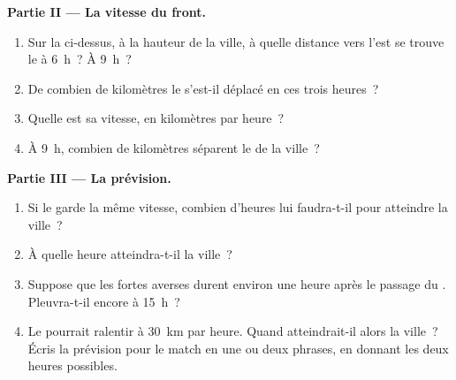 \begin{problem}
\noindent\textbf{Partie II --- La vitesse du front.}\par\nopagebreak
\begin{enumerate}[resume, beginpenalty=10000]
  \item Sur la  ci-dessus, à la hauteur de la ville, à quelle
        distance vers l'est se trouve le  à 6~h~? À 9~h~?
  \item De combien de kilomètres le  s'est-il déplacé en ces trois
        heures~?
  \item Quelle est sa vitesse, en kilomètres par heure~?
  \item À 9~h, combien de kilomètres séparent le  de la ville~?
\end{enumerate}

\noindent\textbf{Partie III --- La prévision.}\par\nopagebreak
\begin{enumerate}[resume, beginpenalty=10000]
  \item Si le  garde la même vitesse, combien d'heures lui faudra-t-il
        pour atteindre la ville~?
  \item À quelle heure atteindra-t-il la ville~?
  \item Suppose que les fortes averses durent environ une heure après le
        passage du . Pleuvra-t-il encore à 15~h~?
  \item Le  pourrait ralentir à \qty{30}{km} par heure. Quand
        atteindrait-il alors la ville~? Écris la prévision pour le match en
        une ou deux phrases, en donnant les deux heures possibles.
\end{enumerate}
\end{problem}
